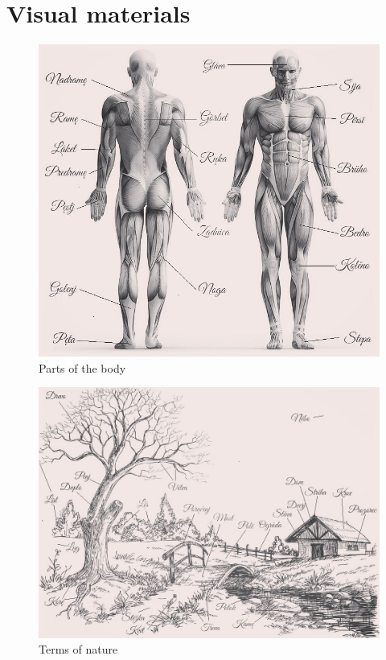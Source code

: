 \section{Visual materials}

\begin{figure}[!htb]
	\includegraphics[width=\linewidth]{./sources/body.jpeg}
	\caption{Parts of the body}
	\label{fig:body}
\end{figure}

\begin{figure}[!htb]
	\includegraphics[width=\linewidth]{./sources/nature.jpeg}
	\caption{Terms of nature}
	\label{fig:nature}
\end{figure}

